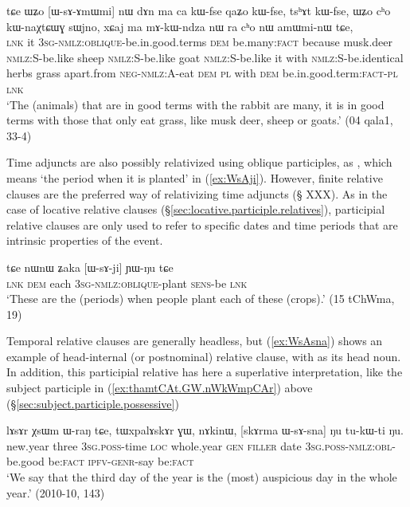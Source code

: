 \begin{exe}
   \ex \label{ex:WsAmWmi}
 \gll  tɕe ɯʑo [ɯ-sɤ-ɤmɯmi] nɯ dɤn ma ca kɯ-fse qaʑo kɯ-fse, tsʰɤt kɯ-fse,  ɯʑo cʰo kɯ-naχtɕɯɣ sɯjno, xɕaj ma mɤ-kɯ-ndza nɯ ra cʰo nɯ amɯmi-nɯ tɕe, \\
\textsc{lnk} it \textsc{3sg-nmlz:oblique}-be.in.good.terms \textsc{dem} be.many:\textsc{fact} because musk.deer \textsc{nmlz:S}-be.like sheep \textsc{nmlz:S}-be.like goat  \textsc{nmlz:S}-be.like it with  \textsc{nmlz:S}-be.identical herbs grass apart.from \textsc{neg-nmlz:A}-eat \textsc{dem} \textsc{pl} with \textsc{dem} be.in.good.term:\textsc{fact}-\textsc{pl} \textsc{lnk} \\
\glt `The (animals) that are in good terms with the rabbit are many, it is in good terms with those that only eat grass, like musk deer, sheep or goats.' (04 qala1, 33-4)
\end{exe}

Time adjuncts are also possibly relativized using oblique participles, as , which means `the period when it is planted' in (\ref{ex:WsAji}). However, finite relative clauses are the preferred way of relativizing time adjuncts (§ XXX). As in the case of locative relative clauses (§\ref{sec:locative.participle.relatives}), participial relative clauses are only used to refer to specific dates and time periods that are intrinsic properties of the event.

\begin{exe}
   \ex \label{ex:WsAji}
   \gll    tɕe nɯnɯ ʑaka [ɯ-sɤ-ji] ɲɯ-ŋu tɕe \\
   \textsc{lnk} \textsc{dem} each \textsc{3sg-nmlz:oblique}-plant \textsc{sens}-be \textsc{lnk}\\
\glt `These are the (periods) when people plant each of these (crops).' (15 tChWma, 19)
\end{exe}

Temporal relative clauses are generally headless, but (\ref{ex:WsAsna}) shows an example of head-internal (or postnominal) relative clause, with  as its head noun. In addition, this participial relative has here a superlative interpretation, like the subject participle in (\ref{ex:thamtCAt.GW.nWkWmpCAr}) above (§\ref{sec:subject.participle.possessive})

\begin{exe}
   \ex \label{ex:WsAsna}
   \gll    lɤsɤr χsɯm ɯ-raŋ tɕe, tɯxpalɤskɤr ɣɯ, nɤkinɯ, [skɤrma ɯ-sɤ-sna] ŋu tu-kɯ-ti ŋu. \\
   new.year three \textsc{3sg}.\textsc{poss}-time \textsc{loc} whole.year \textsc{gen} \textsc{filler} date \textsc{3sg}.\textsc{poss}-\textsc{nmlz}:\textsc{obl}-be.good be:\textsc{fact} \textsc{ipfv}-\textsc{genr}-say be:\textsc{fact} \\
\glt `We say that the third day of the year is the (most) auspicious day in the whole year.' (2010-10, 143)
\end{exe}

